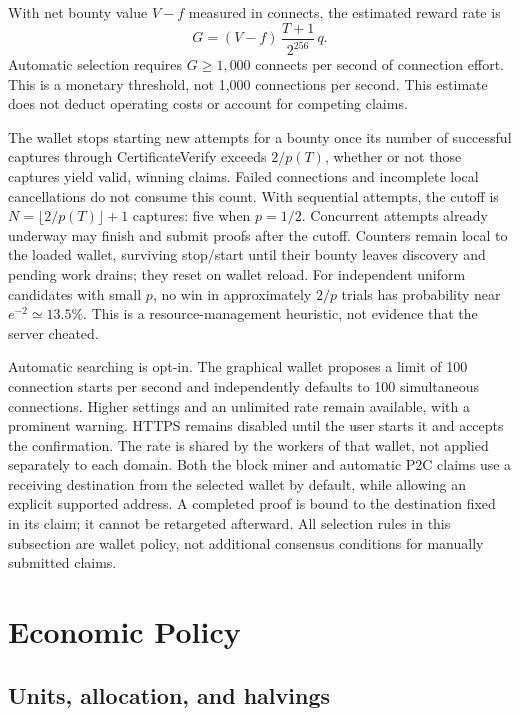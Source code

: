 \documentclass[11pt,a4paper]{article}
\begin{document}
With net bounty value $V-f$ measured in connects, the estimated reward rate is
\begin{equation}
 G=(V-f)\,\frac{T+1}{2^{256}}\,q.
 \label{eq:expectedreward}
\end{equation}
Automatic selection requires $G\geq1{,}000$ connects per second of connection
effort. This is a monetary threshold, not 1,000 connections per second.
This estimate does not deduct operating costs or account for competing claims.

The wallet stops starting new attempts for a bounty once its number of
successful captures through CertificateVerify exceeds $2/p(T)$, whether or not
those captures yield valid, winning claims. Failed connections and incomplete
local cancellations do not consume this count. With sequential attempts, the
cutoff is $N=\lfloor2/p(T)\rfloor+1$ captures: five when $p=1/2$.
Concurrent attempts already underway may finish and submit proofs after the
cutoff. Counters remain local to the loaded wallet, surviving stop/start until
their bounty leaves discovery and pending work drains; they reset on wallet
reload. For independent uniform
candidates with small $p$, no win in approximately $2/p$ trials has probability
near $e^{-2}\simeq13.5\%$. This is a resource-management heuristic, not evidence
that the server cheated.

Automatic searching is opt-in. The graphical wallet proposes a limit of 100
connection starts per second and independently defaults to 100 simultaneous
connections. Higher settings and an unlimited rate remain available, with a
prominent warning. HTTPS remains disabled until the user starts it and accepts
the confirmation. The rate is shared by the workers of that wallet, not applied
separately to each domain. Both the block miner and automatic P2C
claims use a receiving destination from the selected wallet by default, while
allowing an explicit supported address. A completed proof is bound to the
destination fixed in its claim; it cannot be retargeted afterward.
All selection rules in this subsection are wallet policy, not additional
consensus conditions for manually submitted claims.

\section{Economic Policy}

\subsection*{Units, allocation, and halvings}
\end{document}
